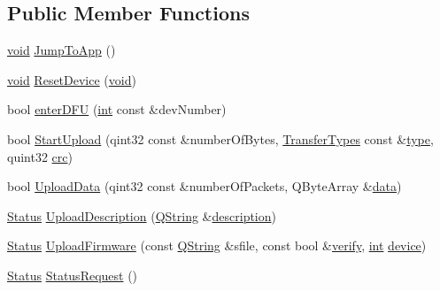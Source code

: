 \subsection*{Public Member Functions}
\begin{DoxyCompactItemize}
\item 
\hyperlink{group___u_a_v_objects_plugin_ga444cf2ff3f0ecbe028adce838d373f5c}{void} \hyperlink{class_o_p___d_f_u_af6c216b0053b9409cef5a5783f985479}{Jump\-To\-App} ()
\item 
\hyperlink{group___u_a_v_objects_plugin_ga444cf2ff3f0ecbe028adce838d373f5c}{void} \hyperlink{class_o_p___d_f_u_a4050740ed07df0801dfe13a1855653e6}{Reset\-Device} (\hyperlink{group___u_a_v_objects_plugin_ga444cf2ff3f0ecbe028adce838d373f5c}{void})
\item 
bool \hyperlink{class_o_p___d_f_u_a1dfcc993110a7afcd002720f07f9f3d2}{enter\-D\-F\-U} (\hyperlink{ioapi_8h_a787fa3cf048117ba7123753c1e74fcd6}{int} const \&dev\-Number)
\item 
bool \hyperlink{class_o_p___d_f_u_a74dd84d96999dd71aee354b6b6863610}{Start\-Upload} (qint32 const \&number\-Of\-Bytes, \hyperlink{class_o_p___d_f_u_a83050451478c761350cd1627e56d4617}{Transfer\-Types} const \&\hyperlink{glext_8h_a7d05960f4f1c1b11f3177dc963a45d86}{type}, quint32 \hyperlink{uavobjecttemplate_8m_a6a3730e10b2455e9a8b6599785809fce}{crc})
\item 
bool \hyperlink{class_o_p___d_f_u_a38036f9148e623c0b991dff8c890d6d4}{Upload\-Data} (qint32 const \&number\-Of\-Packets, Q\-Byte\-Array \&\hyperlink{glext_8h_a8850df0785e6fbcc2351af3b686b8c7a}{data})
\item 
\hyperlink{class_o_p___d_f_u_a83b075feaf572fe76e597acea58c8eda}{Status} \hyperlink{class_o_p___d_f_u_a0467825f1ea6d8c3349ac1f61a612852}{Upload\-Description} (\hyperlink{group___u_a_v_objects_plugin_gab9d252f49c333c94a72f97ce3105a32d}{Q\-String} \&\hyperlink{sdlgamepad_8dox_ae82208d022e4246ddf1e4f481a3f81b0}{description})
\item 
\hyperlink{class_o_p___d_f_u_a83b075feaf572fe76e597acea58c8eda}{Status} \hyperlink{class_o_p___d_f_u_a27179abee3438e035e52f31ceb90e1d3}{Upload\-Firmware} (const \hyperlink{group___u_a_v_objects_plugin_gab9d252f49c333c94a72f97ce3105a32d}{Q\-String} \&sfile, const bool \&\hyperlink{analyze_raw_8m_a1835448b913ced5d93c9665a7a62b20d}{verify}, \hyperlink{ioapi_8h_a787fa3cf048117ba7123753c1e74fcd6}{int} \hyperlink{struct_o_p___d_f_u_1_1device}{device})
\item 
\hyperlink{class_o_p___d_f_u_a83b075feaf572fe76e597acea58c8eda}{Status} \hyperlink{class_o_p___d_f_u_aee6183563d912dfc71bec4f50c63de7a}{Status\-Request} ()

\end{DoxyCompactItemize}
